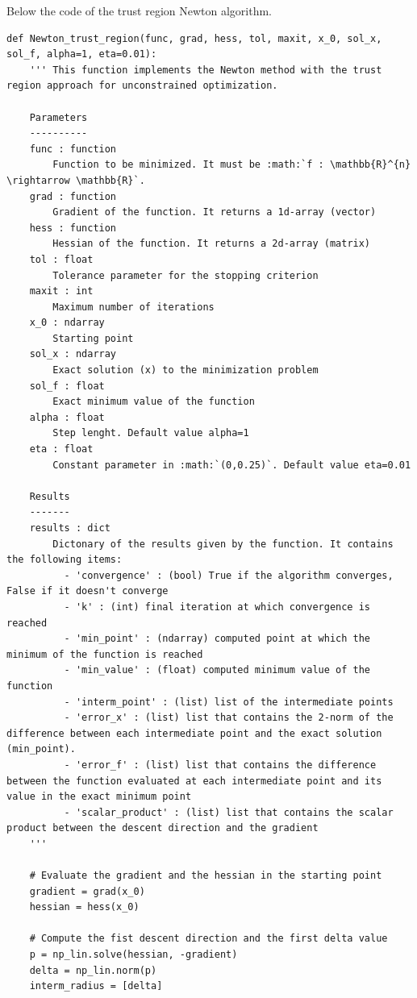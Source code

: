 \documentclass[a4paper,11pt]{article}
\begin{document}
Below the code of the trust region Newton algorithm.


\begin{verbatim}
def Newton_trust_region(func, grad, hess, tol, maxit, x_0, sol_x, sol_f, alpha=1, eta=0.01):
    ''' This function implements the Newton method with the trust region approach for unconstrained optimization.

    Parameters
    ----------
    func : function
        Function to be minimized. It must be :math:`f : \mathbb{R}^{n} \rightarrow \mathbb{R}`.
    grad : function
        Gradient of the function. It returns a 1d-array (vector)
    hess : function
        Hessian of the function. It returns a 2d-array (matrix)
    tol : float
        Tolerance parameter for the stopping criterion
    maxit : int
        Maximum number of iterations
    x_0 : ndarray
        Starting point
    sol_x : ndarray
        Exact solution (x) to the minimization problem
    sol_f : float
        Exact minimum value of the function
    alpha : float
        Step lenght. Default value alpha=1
    eta : float
        Constant parameter in :math:`(0,0.25)`. Default value eta=0.01
        
    Results
    -------
    results : dict
        Dictonary of the results given by the function. It contains the following items:
          - 'convergence' : (bool) True if the algorithm converges, False if it doesn't converge
          - 'k' : (int) final iteration at which convergence is reached
          - 'min_point' : (ndarray) computed point at which the minimum of the function is reached
          - 'min_value' : (float) computed minimum value of the function
          - 'interm_point' : (list) list of the intermediate points
          - 'error_x' : (list) list that contains the 2-norm of the difference between each intermediate point and the exact solution (min_point). 
          - 'error_f' : (list) list that contains the difference between the function evaluated at each intermediate point and its value in the exact minimum point
          - 'scalar_product' : (list) list that contains the scalar product between the descent direction and the gradient
    '''

    # Evaluate the gradient and the hessian in the starting point
    gradient = grad(x_0)
    hessian = hess(x_0)

    # Compute the fist descent direction and the first delta value
    p = np_lin.solve(hessian, -gradient)
    delta = np_lin.norm(p)
    interm_radius = [delta]


\end{verbatim}
\end{document}
